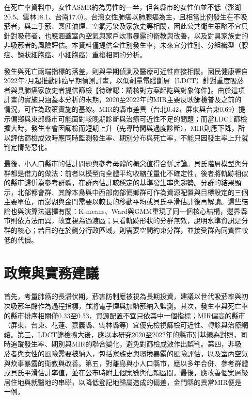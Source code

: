 \documentclass[UTF8,a4paper,11pt]{ctexart}
\newcommand{\note}[1]{\textcolor{red!60!black}{【待確認：#1】}}
\begin{document}
在死亡率資料中，女性ASMR約為男性的一半，但各縣市的女性值並不低（澎湖20.5、雲林18.1、台南17.0）。台灣女性肺癌以肺腺癌為主，且相當比例發生在不吸菸者，與二手菸、烹飪油煙、空氣污染及家族史等相關，因此公共衛生策略不宜只針對吸菸者，也應涵蓋室內空氣與家戶炊事暴露的衛教與改善，以及對具家族史的非吸菸者的風險評估。本資料僅提供全性別發生率，未來宜分性別、分組織型（腺癌、鱗狀細胞癌、小細胞癌）重複相同的分析。

發生與死亡兩端指標的落差，則與早期偵測及醫療可近性直接相關。國民健康署自2022年7月起推動肺癌早期偵測計畫，以低劑量電腦斷層（LDCT）針對重度吸菸者與具肺癌家族史者提供篩檢\note{請核對方案起訖與對象條件}。由於這項計畫的實施只涵蓋本分析的末期，2020至2022年的MIR主要反映篩檢普及之前的情況，可作為政策實施的基線。MIR的縣市差異（台北0.42，屏東與台東0.69）提示偏鄉與東部縣市可能面對較晚期診斷與治療可近性不足的問題；而當LDCT篩檢擴大時，發生率會因篩檢而短期上升（先導時間與過度診斷），MIR則應下降，所以評估篩檢成效時應同時監測發生率、期別分布與死亡率，不能只因發生率上升就判定情勢惡化。

最後，小人口縣市的估計問題與參考母體的概念值得合併討論。貝氏階層模型與分群都是借力的做法：前者以模型向全體平均收縮並量化不確定性，後者將軌跡相似的縣市歸併為參考群體，在群內估計較穩定的基準發生率與趨勢。分群的結果顯示，北部都會群、其餘本島與中西部南部偏鄉群可作為資源配置與目標設定的三個主要單位，而澎湖與金門需要以較長的移動平均或貝氏平滑估計後再解讀。這些結論也與演算法選擇有關：K-means、Ward與GMM重現了同一個核心結構，邊界縣市則依方法而異，故宜視為過渡區；只看軌跡形狀的分群無效，說明水準資訊是分群的核心；若目的在於劃分行政區域，則需要空間約束分群，並接受群內同質性較低的代價。

\section{政策與實務建議}
首先，考量肺癌的長潛伏期，菸害防制應被視為長期投資，建議以世代吸菸率與初次吸菸年齡作為過程指標，並將電子煙與加熱菸納入監測。其次，發生率與死亡率的縣市排序相關僅0.33至0.53，資源配置不宜只依其中一個指標；MIR偏高的縣市（屏東、台東、花蓮、嘉義縣、雲林縣等）宜優先檢視篩檢可近性、轉診與治療網絡。第三，LDCT篩檢擴大後，應以本研究2020至2022年的縣市別基線為對照，同時追蹤發生率、期別與MIR的聯合變化，避免對篩檢成效作出誤判。第四，非吸菸者與女性的風險需要被納入，包括家族史與環境暴露的風險評估，以及室內空氣與炊事暴露的衛教與改善。第五，對離島與小人口縣市，應以多年合併、參考群體或貝氏平滑估計率值，並在公布時附上個案數與信賴區間。最後，應改善個案層級居住地與就醫地的串聯，以降低登記地歸屬造成的偏差，金門縣的異常MIR便是一例。
\end{document}
